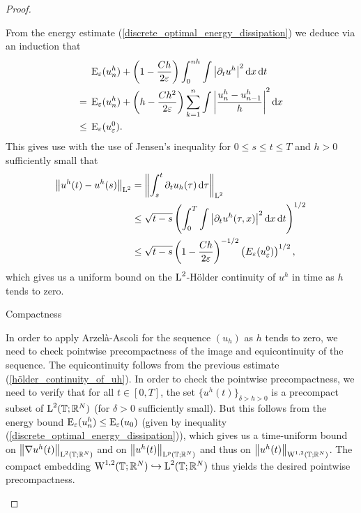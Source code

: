 \begin{proof}
\begin{description}[wide=0pt]
	From the energy estimate (\ref{discrete_optimal_energy_dissipation}) we deduce via an induction that
	\begin{align}
		& \operatorname{E}_{ \varepsilon } ( u_{ n }^{ h } )
		+
		\left(
			1
			-
			\frac{ C h  }{ 2 \varepsilon }
		\right)
		\int_{ 0 }^{ n h }
			\int
				\abs{ \partial_{ t } u^{ h } }^{ 2 }
			\dd{ x }
		\dd{ t }
		\notag
		\\
		={} &
		\operatorname{E}_{ \varepsilon } ( u_{ n }^{ h } )
		+
		\left(
			h - \frac{ C h^{ 2 }}{ 2 \varepsilon }
		\right)
		\sum_{k = 1 }^{ n }
			\int
				 \abs{
				 	\frac{ u_{ n }^{ h } - u_{ n - 1 }^{ h } }{ h }
			 	}^{ 2 }
		 	\dd{ x }
		 \notag
		\\
		\label{energy_and_time_derivative_bound}
		\leq {} &
		\operatorname{E}_{ \varepsilon } ( u_{ \varepsilon }^{ 0 } ).
	\end{align}
	This gives use with the use of Jensen's inequality for $ 0\leq s \leq t \leq T $ and $ h > 0 $ sufficiently small that
	\begin{align}
		\norm{ u^{ h } ( t ) - u^{ h } ( s ) }_{ \operatorname{L}^{ 2 } }
		& =
		\norm{ 
			\int_{ s }^{ t }
				\partial_{ t } u_{ h } ( \tau )
			\dd{ \tau }
		}_{ \operatorname{L}^{ 2 } }
		\notag
		\\
		& \leq
		\sqrt{ t - s }
		\left(	
			\int_{ 0 }^{ T }
					\int
						\abs{ \partial_{ t } u^{ h } ( \tau, x ) }^{ 2 }
					\dd{ x }
				\dd{ t }
		\right)^{ 1/2 }
		\notag
		\\
		\label{hölder_continuity_of_uh}
		& \leq
		\sqrt{ t - s }
		\left(
			1 - \frac{ C h }{ 2 \varepsilon }
		\right)^{ - 1/2 }
		\left(  E_{ \varepsilon } ( u_{ \varepsilon }^{ 0 } ) \right)^{ 1/ 2 },
	\end{align}
	which gives us a uniform bound on the $ \operatorname{L}^{ 2 }$-Hölder continuity of $ u^{ h } $ in time as $ h $ tends to zero.
	
	\item[Step 5:] Compactness
	
	In order to apply Arzelà-Ascoli for the sequence $ (u_{ h } ) $ as $ h $ tends to zero, we need to check pointwise precompactness of the image and equicontinuity of the sequence. 
	The equicontinuity follows from the previous estimate (\ref{hölder_continuity_of_uh}).
	In order to check the pointwise precompactness, we need to verify that for all $ t \in [ 0 , T ] $, the set
	$ \{ u^{ h } ( t ) \}_{ \delta > h > 0 } $ is a precompact subset of $ \operatorname{L}^{ 2 } ( \operatorname{\mathbb{T}} ; \mathbb{ R }^{ N } ) $ (for $ \delta > 0 $ sufficiently small). 
	But this follows from the energy bound $ \operatorname{E}_{ \varepsilon } ( u_{ n }^{ h } ) \leq \operatorname{E}_{ \varepsilon } ( u_{ 0 } ) $ (given by inequality (\ref{discrete_optimal_energy_dissipation})), which gives us a time-uniform bound on $ \norm{ \nabla u^{ h }( t ) }_{\operatorname{L}^{ 2 }( \operatorname{\mathbb{T}}; \mathbb{ R }^{ N } ) } $ and on $ \norm{ u^{ h } ( t )}_{ \operatorname{L}^{ p } ( \operatorname{\mathbb{T}}; \mathbb{ R }^{ N } ) } $ and thus on $ \norm{ u^{ h } ( t )}_{ \operatorname{W}^{ 1 , 2 } ( \operatorname{\mathbb{T}}; \mathbb{ R }^{ N } ) } $. The compact embedding
	$ \operatorname{W}^{ 1 , 2 } ( \operatorname{\mathbb{T}} ; \mathbb{ R }^{ N } ) \hookrightarrow \operatorname{L}^{ 2 } ( \operatorname{\mathbb{T}}; \mathbb{ R }^{ N } ) $ thus yields the desired pointwise precompactness.
	

\end{description}
\end{proof}
